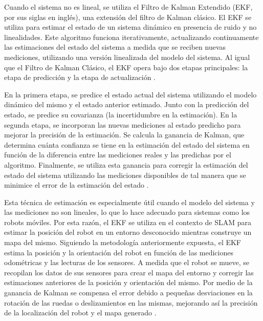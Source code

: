 Cuando el sistema no es lineal, se utiliza el Filtro de Kalman Extendido (EKF, por sus siglas en inglés), una extensión del filtro de Kalman clásico. El EKF se utiliza para estimar el estado de un sistema dinámico en presencia de ruido y no linealidades. Este algoritmo funciona iterativamente, actualizando continuamente las estimaciones del estado del sistema a medida que se reciben nuevas mediciones, utilizando una versión linealizada del modelo del sistema. Al igual que el Filtro de Kalman Clásico, el EKF opera bajo dos etapas principales: la etapa de predicción y la etapa de actualización \cite{corke_robotics_2017}. 

En la primera etapa, se predice el estado actual del sistema utilizando el modelo dinámico del mismo y el estado anterior estimado. Junto con la predicción del estado, se predice su covarianza (la incertidumbre en la estimación). En la segunda etapa, se incorporan las nuevas mediciones al estado predicho para mejorar la precisión de la estimación. Se calcula la ganancia de Kalman, que determina cuánta confianza se tiene en la estimación del estado del sistema en función de la diferencia entre las mediciones reales y las predichas por el algoritmo. Finalmente, se utiliza esta ganancia para corregir la estimación del estado del sistema utilizando las mediciones disponibles de tal manera que se minimice el error de la estimación del estado \cite{corke_robotics_2017}.

Esta técnica de estimación es especialmente útil cuando el modelo del sistema y las mediciones no son lineales, lo que lo hace adecuado para sistemas como los robots móviles. Por esta razón, el EKF se utiliza en el contexto de SLAM para estimar la posición del robot en un entorno desconocido mientras construye un mapa del mismo. Siguiendo la metodología anteriormente expuesta, el EKF estima la posición y la orientación del robot en función de las mediciones odométricas y las lecturas de los sensores. A medida que el robot se mueve, se recopilan los datos de sus sensores para crear el mapa del entorno y corregir las estimaciones anteriores de la posición y orientación del mismo. Por medio de la ganancia de Kalman se compensa el error debido a pequeñas desviaciones en la rotación de las ruedas o deslizamientos en las mismas, mejorando así la precisión de la localización del robot y el mapa generado \cite{thrun_probabilistic_2005}.

